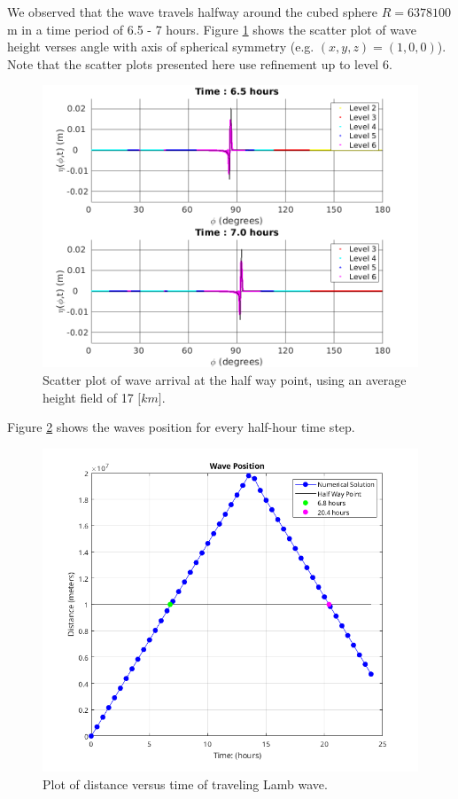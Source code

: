 \documentclass[twoside]{bsu-ms}
\begin{document}
We observed that the wave travels halfway around the cubed sphere $R=6378100$ $\mathrm{m}$ in a time period of 6.5 - 7 hours. Figure \ref{fig:3.3} shows the scatter plot of wave height verses angle with axis of spherical symmetry (e.g. $(x,y,z)=(1,0,0)$). Note that the scatter plots presented here use refinement up to level 6.
\begin{figure}[!htbp]
    \centering
    \includegraphics[width=\textwidth]{images/main1d.png}
    \caption{Scatter plot of wave arrival at the half way point, using an average height field of 17 $\mathrm[km]$.}
    \label{fig:3.3}
\end{figure}
Figure \ref{fig:3.4} shows the waves position for every half-hour time step.
\begin{figure}[!htbp]
    \centering
    \includegraphics[width=\textwidth]{images/wavepos.png}
    \caption{Plot of distance versus time of traveling Lamb wave.}
    \label{fig:3.4}
\end{figure}
\end{document}

